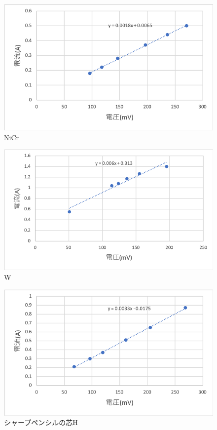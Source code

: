 \documentclass[11pt, a4paper,twocolumn]{jarticle}
\begin{document}
\begin{figure}[htbp]
 \begin{center}
  \includegraphics[width=0.8\linewidth]{fig16.png}
 \end{center}
 \caption{NiCr}
 \label{fig:16}
\end{figure}

\begin{figure}[htbp]
 \begin{center}
  \includegraphics[width=0.8\linewidth]{fig17.png}
 \end{center}
 \caption{W}
 \label{fig:17}
\end{figure}

\begin{figure}[htbp]
 \begin{center}
  \includegraphics[width=0.8\linewidth]{fig18.png}
 \end{center}
 \caption{シャープペンシルの芯H}
 \label{fig:18}
\end{figure}
\end{document}
